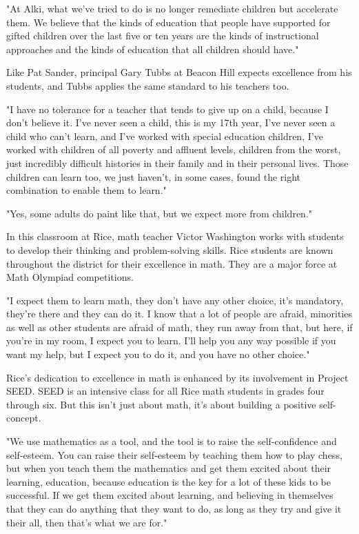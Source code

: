 "At Alki, what we've tried to do is no longer remediate children but accelerate them. We believe that the kinds of education that people have supported for gifted children over the last five or ten years are the kinds of instructional approaches and the kinds of education that all children should have."

Like Pat Sander, principal Gary Tubbs at Beacon Hill expects excellence from his students, and Tubbs applies the same standard to his teachers too.

"I have no tolerance for a teacher that tends to give up on a child, because I don't believe it. I've never seen a child, this is my 17th year, I've never seen a child who can't learn, and I've worked with special education children, I've worked with children of all poverty and affluent levels, children from the worst, just incredibly difficult histories in their family and in their personal lives. Those children can learn too, we just haven't, in some cases, found the right combination to enable them to learn."

"Yes, some adults do paint like that, but we expect more from children."

In this classroom at Rice, math teacher Victor Washington works with students to develop their thinking and problem-solving skills. Rice students are known throughout the district for their excellence in math. They are a major force at Math Olympiad competitions.

"I expect them to learn math, they don't have any other choice, it's mandatory, they're there and they can do it. I know that a lot of people are afraid, minorities as well as other students are afraid of math, they run away from that, but here, if you're in my room, I expect you to learn. I'll help you any way possible if you want my help, but I expect you to do it, and you have no other choice."

Rice's dedication to excellence in math is enhanced by its involvement in Project SEED. SEED is an intensive class for all Rice math students in grades four through six. But this isn't just about math, it's about building a positive self-concept.

"We use mathematics as a tool, and the tool is to raise the self-confidence and self-esteem. You can raise their self-esteem by teaching them how to play chess, but when you teach them the mathematics and get them excited about their learning, education, because education is the key for a lot of these kids to be successful. If we get them excited about learning, and believing in themselves that they can do anything that they want to do, as long as they try and give it their all, then that's what we are for."

